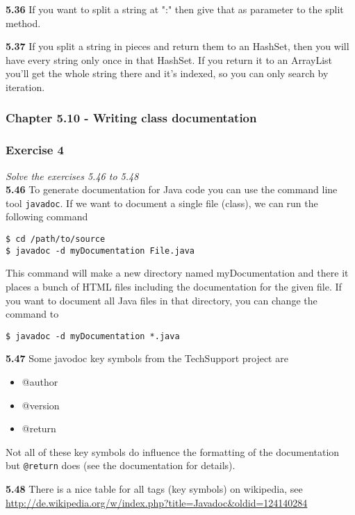 \textbf{5.36} If you want to split a string at ":" then give that as parameter
to the split method.

\textbf{5.37} If you split a string in pieces and return them to an HashSet,
then you will have every string only once in that HashSet. If you return it
to an ArrayList you'll get the whole string there and it's indexed, so you can
only search by iteration.

\subsubsection{Chapter 5.10 - Writing class documentation}

\subsubsection*{Exercise 4}
\textit{Solve the exercises 5.46 to 5.48} \\

\textbf{5.46} To generate documentation for Java code you can use the command
line tool \lstinline{javadoc}. If we want to document a single file (class),
we can run the following command

\begin{lstlisting}
$ cd /path/to/source
$ javadoc -d myDocumentation File.java
\end{lstlisting}

This command will make a new directory named myDocumentation and there it
places a bunch of HTML files including the documentation for the given file.
If you want to document all Java files in that directory, you can change the
command to 

\begin{lstlisting}
$ javadoc -d myDocumentation *.java
\end{lstlisting}

\textbf{5.47} Some javodoc key symbols from the TechSupport project are
\begin{itemize}
	\item @author
	\item @version
	\item @return
\end{itemize}

Not all of these key symbols do influence the formatting of the documentation
but \lstinline{@return} does (see the documentation for details).

\textbf{5.48} There is a nice table for all tags (key symbols) on wikipedia,
see \url{http://de.wikipedia.org/w/index.php?title=Javadoc&oldid=124140284}

